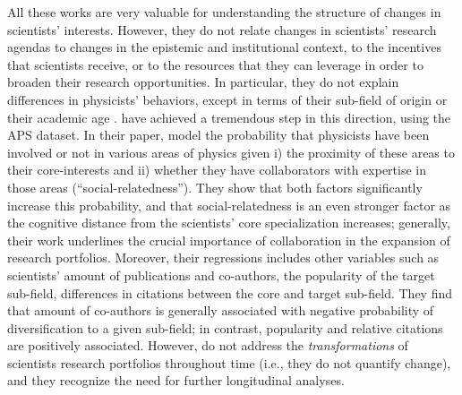 \documentclass{article}
\begin{document}
All these works are very valuable for understanding the structure of changes in scientists' interests. %
However, they do not relate changes in scientists' research agendas to changes in the epistemic and institutional context, to the incentives that scientists receive, or to the resources that they can leverage in order to broaden their research opportunities. In particular, they do not explain differences in physicists' behaviors, except in terms of their sub-field of origin or their academic age \citep{Zeng2019,Aleta2019}. \citet{Tripodi2020} have achieved a tremendous step in this direction, using the APS dataset. In their paper, \citeauthor{Tripodi2020} model the probability that physicists have been involved or not in various areas of physics given i) the proximity of these areas to their core-interests and ii) whether they have collaborators with expertise in those areas (``social-relatedness''). They show that both factors significantly increase this probability, and that social-relatedness is an even stronger factor as the cognitive distance from the scientists' core specialization increases; generally, their work underlines the crucial importance of collaboration in the expansion of research portfolios. Moreover, their regressions includes other variables such as scientists' amount of publications and co-authors, the popularity of the target sub-field, differences in citations between the core and target sub-field. They find that amount of co-authors is generally associated with negative probability of diversification to a given sub-field; in contrast, popularity and relative citations are positively associated. However, \citeauthor{Tripodi2020} do not address the \textit{transformations} of scientists research portfolios throughout time (i.e., they do not quantify change), and they recognize the need for further longitudinal analyses.
\end{document}
